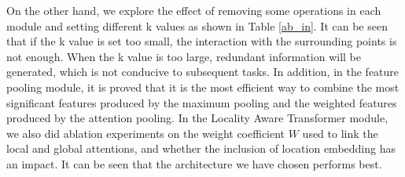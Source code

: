 \documentclass[conference]{IEEEtran}
\begin{document}
\vspace{-3mm}
\begin{table}[h]
\caption{Ablation experiments for different modules.}
\centering
\vspace{-2mm}

\label{ab_module}
\vspace{-2mm}
\end{table}


On the other hand, we explore the effect of removing some operations in each module and setting different k values as shown in Table \ref{ab_in}. It can be seen that if the k value is set too small, the interaction with the surrounding points is not enough. When the k value is too large, redundant information will be generated, which is not conducive to subsequent tasks. In addition, in the feature pooling module, it is proved that it is the most efficient way to combine the most significant features produced by the maximum pooling and the weighted features produced by the attention pooling. In the Locality Aware Transformer module, we also did ablation experiments on the weight coefficient $W$ used to link the local and global attentions, and whether the inclusion of location embedding has an impact. It can be seen that the architecture we have chosen  performs best.
\end{document}
